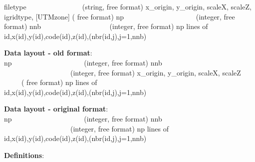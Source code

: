 \documentclass{article}
\begin{document}
\noindent
filetype\ \ \ \ \ \ \ \ \ \ \ \ \ \ \ \ (string, free format) \newline
x\_origin, y\_origin, scaleX, scaleZ, igridtype,  [UTMzone] ( free format)\newline
np \ \ \ \ \ \ \ \ \ \ \ \ \ \ \ \ \ \ \ \ (integer, free format)\newline
nnb \ \ \ \ \ \ \ \ \ \ \ \ \ \ \ \ \ \ \ (integer, free format)\newline
np lines of \\
id,x(id),y(id),code(id),z(id),(nbr(id,j),j=1,nnb)\newline

\textbf{Data layout - old format}: \\ 

\noindent
np \ \ \ \ \ \ \ \ \ \ \ \ \ \ \ \ \ \ \ \ (integer, free format)\newline
nnb \ \ \ \ \ \ \ \ \ \ \ \ \ \ \ \ \ \ \ (integer, free format)\newline
x\_origin, y\_origin, scaleX, scaleZ \ \ \ \ \ ( free format)\newline
np lines of \\
id,x(id),y(id),code(id),z(id),(nbr(id,j),j=1,nnb)\newline

\textbf{Data layout - original format}: \\ 

\noindent
np \ \ \ \ \ \ \ \ \ \ \ \ \ \ \ \ \ \ \ \ (integer, free format)\newline
nnb \ \ \ \ \ \ \ \ \ \ \ \ \ \ \ \ \ \ \ (integer, free format)\newline
np lines of \\
id,x(id),y(id),code(id),z(id),(nbr(id,j),j=1,nnb)\newline

\noindent\textbf{Definitions}:\\ 
\end{document}
